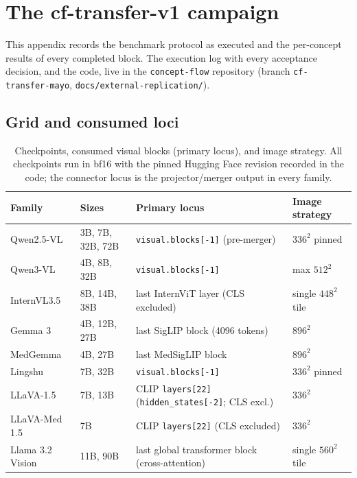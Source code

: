 \section{The cf-transfer-v1 campaign}
\label{app:cf-transfer}

This appendix records the benchmark protocol as executed and the per-concept results of every completed block. The execution log with every acceptance decision, and the code, live in the \texttt{concept-flow} repository (branch \texttt{cf-transfer-mayo}, \texttt{docs/external-replication/}).

\subsection{Grid and consumed loci}
\label{app:cf-grid}

\begin{table}[h]
\centering\scriptsize\setlength{\tabcolsep}{4pt}
\caption{Checkpoints, consumed visual blocks (primary locus), and image strategy. All checkpoints run in bf16 with the pinned Hugging Face revision recorded in the code; the connector locus is the projector/merger output in every family.}
\label{tab:cf-grid}
\begin{tabular}{llll}
\toprule
Family & Sizes & Primary locus & Image strategy \\
\midrule
Qwen2.5-VL & 3B, 7B, 32B, 72B & \texttt{visual.blocks[-1]} (pre-merger) & $336^2$ pinned \\
Qwen3-VL & 4B, 8B, 32B & \texttt{visual.blocks[-1]} & max $512^2$ \\
InternVL3.5 & 8B, 14B, 38B & last InternViT layer (CLS excluded) & single $448^2$ tile \\
Gemma 3 & 4B, 12B, 27B & last SigLIP block (4096 tokens) & $896^2$ \\
MedGemma & 4B, 27B & last MedSigLIP block & $896^2$ \\
Lingshu & 7B, 32B & \texttt{visual.blocks[-1]} & $336^2$ pinned \\
LLaVA-1.5 & 7B, 13B & CLIP \texttt{layers[22]} (\texttt{hidden\_states[-2]}; CLS excl.) & $336^2$ \\
LLaVA-Med 1.5 & 7B & CLIP \texttt{layers[22]} (CLS excluded) & $336^2$ \\
Llama 3.2 Vision & 11B, 90B & last global transformer block (cross-attention) & single $560^2$ tile \\
\bottomrule
\end{tabular}
\end{table}

